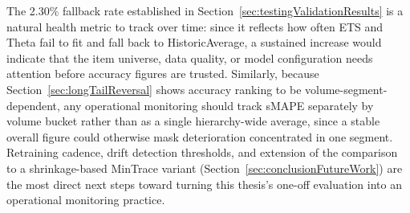 The 2.30\% fallback rate established in Section~\ref{sec:testingValidationResults} is a natural health metric to track over time: since it reflects how often ETS and Theta fail to fit and fall back to HistoricAverage, a sustained increase would indicate that the item universe, data quality, or model configuration needs attention before accuracy figures are trusted. Similarly, because Section~\ref{sec:longTailReversal} shows accuracy ranking to be volume-segment-dependent, any operational monitoring should track sMAPE separately by volume bucket rather than as a single hierarchy-wide average, since a stable overall figure could otherwise mask deterioration concentrated in one segment. Retraining cadence, drift detection thresholds, and extension of the comparison to a shrinkage-based MinTrace variant (Section~\ref{sec:conclusionFutureWork}) are the most direct next steps toward turning this thesis's one-off evaluation into an operational monitoring practice.